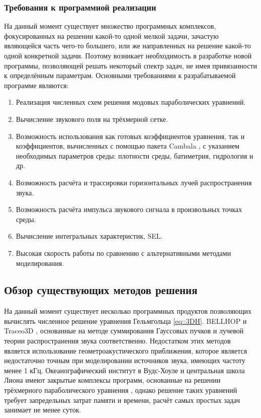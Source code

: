 \documentclass[../document.tex]{subfiles}
\begin{document}
        \subsubsection{Требования к программной реализации}
            \par На данный момент существует множество программных комплексов, фокусированных на решении какой-то одной мелкой задачи, зачастую являющейся часть чего-то большего, или же направленных на решение какой-то одной конкретной задачи. Поэтому возникает необходимость в разработке новой программы, позволяющей решать некоторый спектр задач, не имея привязанности к определённым параметрам. Основными требованиями к разрабатываемой программе являются:
            \begin{enumerate}
                \item Реализация численных схем решения модовых параболических уравнений.
                \item Вычисление звукового поля на трёхмерной сетке.
                \item Возможность использования как готовых коэффициентов уравнения, так
и коэффициентов, вычисленных с помощью пакета Cambala \cite{cambala}, с указанием необхо­димых параметров среды: плотности среды, батиметрия, гидрология и др.
                \item Возможность расчёта и трассировки горизонтальных лучей распространения звука.
                \item Возможность расчёта импульса звукового сигнала в произвольных точках среды.
                \item Вычисление интегральных характеристик, SEL.
                \item Высокая скорость работы по сравнению с альтернативными методами моделирования.
            \end{enumerate}
    \subsection{Обзор существующих методов решения}
        \par На данный момент существует несколько программных продуктов позволяющих вычислять численное решение уравнения Гельмгольца \eqref{eq::3DH}. BELLHOP \cite{bellhop} и Traceo3D \cite{traceo}, основанные на методе суммирования Гауссовых пучков и лучевой теории распространения звука соответственно. Недостатком этих методов является использование геометроакустического приближения, которое является недостаточно точным при моделировании источников звука, имеющих частоту менее 1 кГц. Океанографический институт в Вудс-Хоуле \cite{whoi} и центральная школа Лиона \cite{lyon} имеют закрытые комплексы программ, основанные на решении трёхмерного параболического уравнения \cite{isakson14,lin12,shtrum16}, однако решение таких уравнений требует запредельных затрат памяти и времени, расчёт самых простых задач занимает не менее суток.
\end{document}
